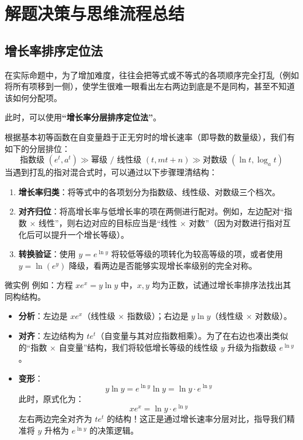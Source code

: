 \documentclass[11pt,a4paper]{ctexart}
\begin{document}
\newpage

\section{解题决策与思维流程总结}

\subsection{增长率排序定位法}

在实际命题中，为了增加难度，往往会把等式或不等式的各项顺序完全打乱（例如将所有项移到一侧），使学生很难一眼看出左右两边到底是不是同构，甚至不知道该如何分配项。

此时，可以使用\textbf{“增长率分层排序定位法”}。

根据基本初等函数在自变量趋于正无穷时的增长速率（即导数的数量级），我们有如下的分层排位：
\[
\text{指数级 } (e^t, a^t) \gg \text{幂级 / 线性级 } (t, mt+n) \gg \text{对数级 } (\ln t, \log_a t)
\]
当遇到打乱的指对混合式时，可以通过以下步骤理清结构：
\begin{enumerate}
  \item \textbf{增长率归类}：将等式中的各项划分为指数级、线性级、对数级三个档次。
  \item \textbf{对齐归位}：将高增长率与低增长率的项在两侧进行配对。例如，左边配对“指数 $\times$ 线性”，则右边对应的目标应当是“线性 $\times$ 对数”（因为对数进行指对互化后可以提升一个增长等级）。
  \item \textbf{转换验证}：使用 $y = e^{\ln y}$ 将较低等级的项转化为较高等级的项，或者使用 $y = \ln(e^y)$ 降级，看两边是否能够实现增长率级别的完全对称。
\end{enumerate}

\begin{teachbox}{微实例}
例如：方程 $x e^x = y \ln y$ 中，$x, y$ 均为正数，试通过增长率排序法找出其同构结构。
\begin{itemize}
  \item \textbf{分析}：左边是 $x e^x$（线性级 $\times$ 指数级）；右边是 $y \ln y$（线性级 $\times$ 对数级）。
  \item \textbf{对齐}：左边结构为 $t e^t$（自变量与其对应指数相乘）。为了在右边也凑出类似的“指数 $\times$ 自变量”结构，我们将较低增长等级的线性级 $y$ 升级为指数级 $e^{\ln y}$。
  \item \textbf{变形}：
    \[
    y \ln y = e^{\ln y} \ln y = \ln y \cdot e^{\ln y}
    \]
    此时，原式化为：
    \[
    x e^x = \ln y \cdot e^{\ln y}
    \]
    左右两边完全对齐为 $t e^t$ 的结构！这正是通过增长速率分层对比，指导我们精准将 $y$ 升格为 $e^{\ln y}$ 的决策逻辑。
\end{itemize}
\end{teachbox}
\end{document}
